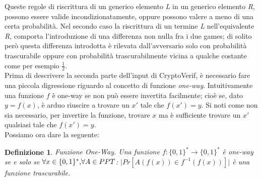 \documentclass[a4paper,openright,twoside,12pt]{report}
\newtheorem{definizione}{Definizione}[chapter]
\begin{document}
Queste regole di riscrittura di un generico elemento \emph{L} in un generico elemento \emph{R}, possono essere valide incondizionatamente, 
oppure possono valere a meno di una certa probabilit\`a.
Nel secondo caso la riscrittura di un termine \emph{L} nell'equivalente \emph{R}, comporta l'introduzione di una differenza non nulla fra i due games; di solito per\`o
questa differenza introdotta \`e rilevata dall'avversario solo con probabilit\`a trascurabile oppure con probabilit\`a trascurabilmente vicina a qualche costante come 
per esempio $\frac{1}{2}$.
\\ 
Prima di descrivere la seconda parte dell'input di CryptoVerif, \`e necessario fare una piccola digressione riguardo al concetto di funzione \emph{one-way}.
Intuitivamente una funzione $f$ \`e one-way se non pu\`o essere invertita facilmente; cio\`e se, dato $y=f(x)$, \`e arduo riuscire a trovare un $x'$ tale che $f(x')=y$. 
Si noti come non sia necessario, per invertire la funzione, trovare $x$ ma \`e sufficiente trovare un $x'$ qualsiasi tale che $f(x')=y$.
\\Possiamo ora dare la seguente:
\begin{definizione}{Funzione One-Way.}
Una funzione $f: \{0,1\}^*\rightarrow \{0,1\}^*$ \`e one-way se e solo se $\forall x \in  \{0,1\}^* \hbox{,} \forall A \in PPT$:  $\lvert Pr[A(f(x)) \in f^{-1}(f(x))]\rvert$ \`e una funzione 
trascurabile.
\end{definizione}
\end{document}
